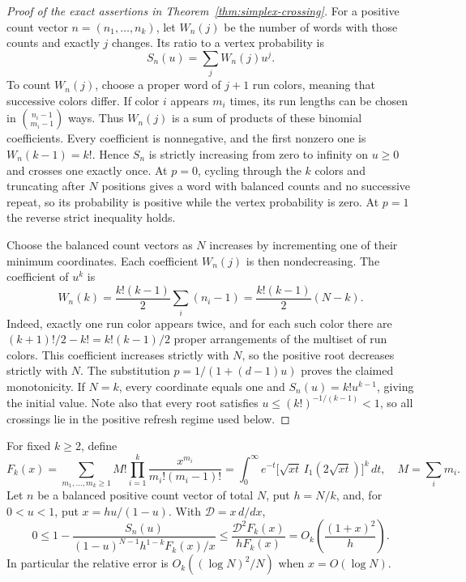 \begin{proof}[Proof of the exact assertions in Theorem~\ref{thm:simplex-crossing}]
For a positive count vector $n=(n_1,\ldots,n_k)$, let $W_n(j)$ be the number
of words with those counts and exactly $j$ changes. Its ratio to a vertex
probability is
\[
S_n(u)=\sum_jW_n(j)u^j.
\]
To count $W_n(j)$, choose a proper word of $j+1$ run colors, meaning that
successive colors differ. If color $i$ appears $m_i$ times, its run lengths
can be chosen in $\binom{n_i-1}{m_i-1}$ ways. Thus $W_n(j)$ is a sum of
products of these binomial coefficients. Every coefficient is nonnegative,
and the first nonzero one is $W_n(k-1)=k!$. Hence $S_n$ is strictly increasing
from zero to infinity on $u\ge0$ and crosses one exactly once. At $p=0$,
cycling through the $k$ colors and truncating after $N$ positions gives a
word with balanced counts and no successive repeat, so its probability is
positive while the vertex probability is zero. At $p=1$ the reverse strict
inequality holds.

Choose the balanced count vectors as $N$ increases by incrementing one of
their minimum coordinates. Each coefficient $W_n(j)$ is then nondecreasing.
The coefficient of $u^k$ is
\[
W_n(k)=\frac{k!(k-1)}2\sum_i(n_i-1)
=\frac{k!(k-1)}2(N-k).
\]
Indeed, exactly one run color appears twice, and for each such color there are
$(k+1)!/2-k!=k!(k-1)/2$ proper arrangements of the multiset of run colors.
This coefficient increases strictly with $N$, so the positive root decreases
strictly with $N$. The substitution $p=1/(1+(d-1)u)$ proves the claimed
monotonicity. If $N=k$, every coordinate equals one and
$S_n(u)=k!u^{k-1}$, giving the initial value. Note also that every root
satisfies $u\le(k!)^{-1/(k-1)}<1$, so all crossings lie in the positive
refresh regime used below.
\end{proof}

\begin{lemma}\label{lem:simplex-integral}
For fixed $k\ge2$, define
\begin{equation}\label{eq:simplex-F}
F_k(x)=\sum_{m_1,\ldots,m_k\ge1}
M!\prod_{i=1}^k\frac{x^{m_i}}{m_i!(m_i-1)!}
=\int_0^\infty e^{-t}\bigl[\sqrt{xt}\,I_1(2\sqrt{xt})\bigr]^k\,dt,
\quad M=\sum_i m_i.
\end{equation}
Let $n$ be a balanced positive count vector of total $N$, put $h=N/k$,
and, for $0<u<1$, put $x=hu/(1-u)$. With $\mathcal D=x\,d/dx$,
\begin{equation}\label{eq:simplex-discrete-comparison}
0\le 1-\frac{S_n(u)}{(1-u)^{N-1}h^{1-k}F_k(x)/x}
\le\frac{\mathcal D^2F_k(x)}{hF_k(x)}
=O_k\!\left(\frac{(1+x)^2}{h}\right).
\end{equation}
In particular the relative error is $O_k((\log N)^2/N)$ when $x=O(\log N)$.
\end{lemma}

